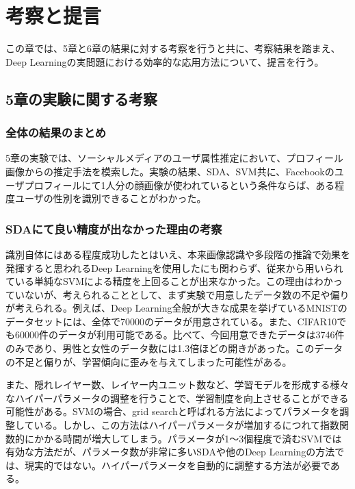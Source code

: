 \chapter{考察と提言}
この章では、5章と6章の結果に対する考察を行うと共に、考察結果を踏まえ、Deep Learningの実問題における効率的な応用方法について、提言を行う。

\section{5章の実験に関する考察}
\subsection{全体の結果のまとめ}
5章の実験では、ソーシャルメディアのユーザ属性推定において、プロフィール画像からの推定手法を模索した。実験の結果、SDA、SVM共に、Facebookのユーザプロフィールにて1人分の顔画像が使われているという条件ならば、ある程度ユーザの性別を識別できることがわかった。\par
\subsection{SDAにて良い精度が出なかった理由の考察}
識別自体にはある程度成功したとはいえ、本来画像認識や多段階の推論で効果を発揮すると思われるDeep Learningを使用したにも関わらず、従来から用いられている単純なSVMによる精度を上回ることが出来なかった。この理由はわかっていないが、考えられることとして、まず実験で用意したデータ数の不足や偏りが考えられる。例えば、Deep Learning全般が大きな成果を挙げているMNISTのデータセットには、全体で70000のデータが用意されている。また、CIFAR10でも60000件のデータが利用可能である。比べて、今回用意できたデータは3746件のみであり、男性と女性のデータ数には1.3倍ほどの開きがあった。このデータの不足と偏りが、学習傾向に歪みを与えてしまった可能性がある。\par
また、隠れレイヤー数、レイヤー内ユニット数など、学習モデルを形成する様々なハイパーパラメータの調整を行うことで、学習制度を向上させることができる可能性がある。SVMの場合、grid searchと呼ばれる方法によってパラメータを調整している。しかし、この方法はハイパーパラメータが増加するにつれて指数関数的にかかる時間が増大してしまう。パラメータが1〜3個程度で済むSVMでは有効な方法だが、パラメータ数が非常に多いSDAや他のDeep Learningの方法では、現実的ではない。ハイパーパラメータを自動的に調整する方法が必要である。
